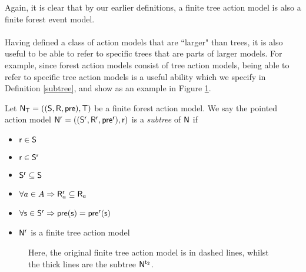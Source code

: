 Again, it is clear that by our earlier definitions, a finite tree action model is also a finite forest event
model.\\
\\
Having defined a class of action models that are ``larger" than trees, it is also useful to be able
to refer to specific trees that are parts of larger models.
For example, since forest action models consist of tree action models, being able to refer to specific
tree action models is a useful ability which we specify in Definition \ref{subtree}, and show as an
example in Figure \ref{figure:subtreeExample}.

\begin{defn} \label{subtree}
Let $\mathrm{\mathsf{N}}_\mathrm{\mathsf{T}} = ((\mathrm{\mathsf{S}}, \mathrm{\mathsf{R}}, \mathrm{\mathsf{pre}}), \mathrm{\mathsf{T}})$ be a finite forest action model.
We say the pointed action model $\mathrm{\mathsf{N}}^{\mathrm{\mathsf{r}}} = ((\mathrm{\mathsf{S}}^{\mathrm{\mathsf{r}}}, \mathrm{\mathsf{R}}^{\mathrm{\mathsf{r}}}, \mathrm{\mathsf{pre}}^{\mathrm{\mathsf{r}}}), \mathrm{\mathsf{r}})$ is a {\em subtree} of $\mathrm{\mathsf{N}}$ if
\begin{itemize}
	\item $\mathrm{\mathsf{r}} \in \mathrm{\mathsf{S}}$
	\item $\mathrm{\mathsf{r}} \in \mathrm{\mathsf{S}}^\mathrm{\mathsf{r}}$
	\item $\mathrm{\mathsf{S}}^\mathrm{\mathsf{r}} \subseteq \mathrm{\mathsf{S}}$
	\item $\forall a \in A \Rightarrow \mathrm{\mathsf{R}}_a^\mathrm{\mathsf{r}} \subseteq \mathrm{\mathsf{R}}_a$
	\item $\forall \mathrm{\mathsf{s}} \in \mathrm{\mathsf{S}}^\mathrm{\mathsf{r}} \Rightarrow \mathrm{\mathsf{pre}}(\mathrm{\mathsf{s}}) = \mathrm{\mathsf{pre}}^\mathrm{\mathsf{r}}(\mathrm{\mathsf{s}}) $
	\item $\mathrm{\mathsf{N}}^\mathrm{\mathsf{r}}$ is a finite tree action model
\end{itemize}
\end{defn}

\begin{figure}
	\centering
{}
	\caption[Example subtrees]{Here, the original finite tree action model is in dashed lines, whilst
	the thick lines are the subtree $\mathrm{\mathsf{N}}^{\mathrm{\mathsf{t}}_2}$.}
	\label{figure:subtreeExample}
\end{figure}


